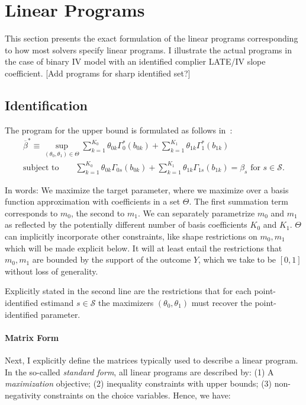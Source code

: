 \documentclass[12pt,a4paper,english]{article} %
\numberwithin{equation}{section}
\numberwithin{figure}{section}
\numberwithin{table}{section}
\begin{document}




\appendix

\section{Linear Programs}\label{app_sec:linear_programs}
This section presents the exact formulation of the linear programs corresponding to how most solvers specify linear programs.
I illustrate the actual programs in the case of binary IV model with an identified complier LATE/IV slope coefficient.
[Add programs for sharp identified set?]

\subsection{Identification}

The program for the upper bound is formulated as follows in~\cite{mogstad2018using}:
\begin{align}
  \overline{\beta}^* \equiv \sup_{(\theta_0, \theta_1)\in\Theta} \sum_{k=1}^{K_0}\theta_{0k}\Gamma^*_0(b_{0k}) + \sum_{k=1}^{K_1}\theta_{1k}\Gamma^*_1(b_{1k}) \\
  \text{subject to} \qquad \sum_{k=1}^{K_0}\theta_{0k}\Gamma_{0s}(b_{0k}) + \sum_{k=1}^{K_1}\theta_{1k}\Gamma_{1s}(b_{1k}) = \beta_s \text{ for } s \in \mathcal{S}.
\end{align}

In words: We maximize the target parameter, where we maximize over a basis function approximation with coefficients in a set $\Theta$.
The first summation term corresponds to $m_0$, the second to $m_1$.
We can separately parametrize $m_0$ and $m_1$ as reflected by the potentially different number of basis coefficients $K_0$ and $K_1$.
$\Theta$ can implicitly incorporate other constraints, like shape restrictions on $m_0, m_1$ which will be made explicit below.
It will at least entail the restrictions that $m_0, m_1$ are bounded by the support of the outcome $Y$, which we take to be $[0,1]$ without loss of generality.

Explicitly stated in the second line are the restrictions that for each point-identified estimand $s\in\mathcal{S}$ the maximizers $(\theta_0, \theta_1)$ must recover the point-identified parameter.

\paragraph{Matrix Form}
Next, I explicitly define the matrices typically used to describe a linear program.
In the so-called \textit{standard form}, all linear programs are described by:
(1) A \textit{maximization} objective; (2) inequality constraints with upper bounds; (3) non-negativity constraints on the choice variables.
Hence, we have:
\end{document}
